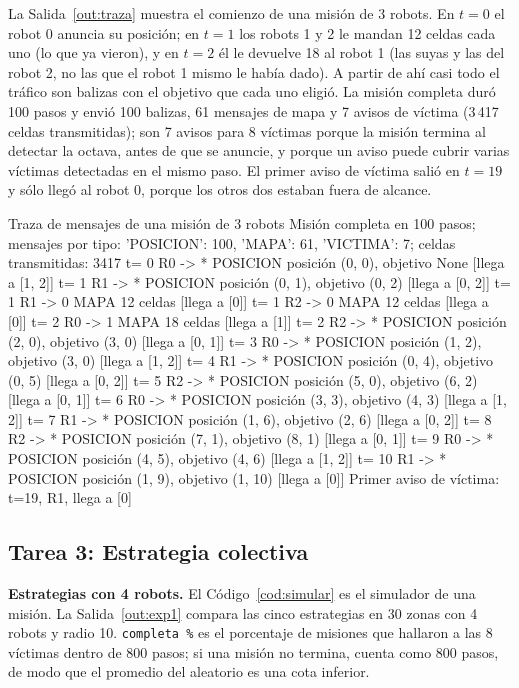 \documentclass[11pt,letterpaper]{article}
\begin{document}
La Salida~\ref{out:traza} muestra el comienzo de una misión de 3 robots. En $t = 0$ el robot 0 anuncia su posición; en $t = 1$ los robots 1 y 2 le mandan 12 celdas cada uno (lo que ya vieron), y en $t = 2$ él le devuelve 18 al robot 1 (las suyas y las del robot 2, no las que el robot 1 mismo le había dado). A partir de ahí casi todo el tráfico son balizas con el objetivo que cada uno eligió. La misión completa duró 100 pasos y envió 100 balizas, 61 mensajes de mapa y 7 avisos de víctima (3\,417 celdas transmitidas); son 7 avisos para 8 víctimas porque la misión termina al detectar la octava, antes de que se anuncie, y porque un aviso puede cubrir varias víctimas detectadas en el mismo paso. El primer aviso de víctima salió en $t = 19$ y sólo llegó al robot 0, porque los otros dos estaban fuera de alcance.

\begin{consola}[label=out:traza]{Traza de mensajes de una misión de 3 robots}
Misión completa en 100 pasos; mensajes por tipo: {'POSICION': 100, 'MAPA': 61, 'VICTIMA': 7}; celdas transmitidas: 3417
t=  0  R0 ->  *  POSICION  posición (0, 0), objetivo None   [llega a [1, 2]]
t=  1  R1 ->  *  POSICION  posición (0, 1), objetivo (0, 2)   [llega a [0, 2]]
t=  1  R1 ->  0  MAPA      12 celdas   [llega a [0]]
t=  1  R2 ->  0  MAPA      12 celdas   [llega a [0]]
t=  2  R0 ->  1  MAPA      18 celdas   [llega a [1]]
t=  2  R2 ->  *  POSICION  posición (2, 0), objetivo (3, 0)   [llega a [0, 1]]
t=  3  R0 ->  *  POSICION  posición (1, 2), objetivo (3, 0)   [llega a [1, 2]]
t=  4  R1 ->  *  POSICION  posición (0, 4), objetivo (0, 5)   [llega a [0, 2]]
t=  5  R2 ->  *  POSICION  posición (5, 0), objetivo (6, 2)   [llega a [0, 1]]
t=  6  R0 ->  *  POSICION  posición (3, 3), objetivo (4, 3)   [llega a [1, 2]]
t=  7  R1 ->  *  POSICION  posición (1, 6), objetivo (2, 6)   [llega a [0, 2]]
t=  8  R2 ->  *  POSICION  posición (7, 1), objetivo (8, 1)   [llega a [0, 1]]
t=  9  R0 ->  *  POSICION  posición (4, 5), objetivo (4, 6)   [llega a [1, 2]]
t= 10  R1 ->  *  POSICION  posición (1, 9), objetivo (1, 10)   [llega a [0]]
Primer aviso de víctima: t=19, R1, llega a [0]
\end{consola}

\subsection{Tarea 3: Estrategia colectiva}

\textbf{Estrategias con 4 robots.} El Código~\ref{cod:simular} es el simulador de una misión. La Salida~\ref{out:exp1} compara las cinco estrategias en 30 zonas con 4 robots y radio 10. \texttt{completa~\%} es el porcentaje de misiones que hallaron a las 8 víctimas dentro de 800 pasos; si una misión no termina, cuenta como 800 pasos, de modo que el promedio del aleatorio es una cota inferior.
\end{document}
